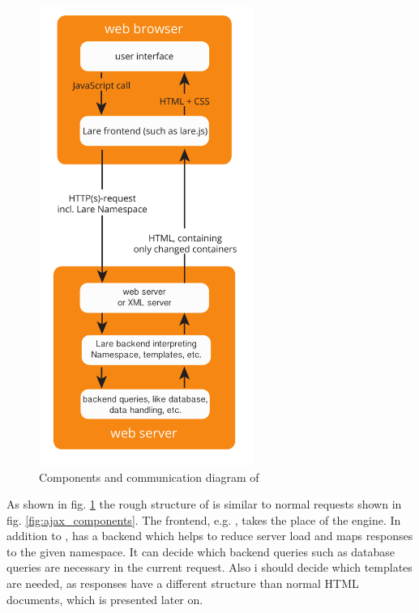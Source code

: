 \begin{figure}[H]
\centering
\includegraphics[height=15cm]{images/lare.pdf}
\caption[lare_components]{Components and communication diagram of \lare{}}
\label{fig:lare_components}
\end{figure}


\noindent{}As shown in fig. \ref{fig:lare_components} the rough structure of \lare{} is similar to normal \ajax{} requests shown in fig. \ref{fig:ajax_components}.
The \lare{} frontend, e.g. \lareJS{}, takes the place of the \ajax{} engine.
In addition to \ajax{}, \lare{} has a backend which helps to reduce server load and maps responses to the given namespace.
It can decide which backend queries such as database queries are necessary in the current request.
Also i should decide which templates are needed, as \lare{} responses have a different structure than normal HTML documents, which is presented later on.

